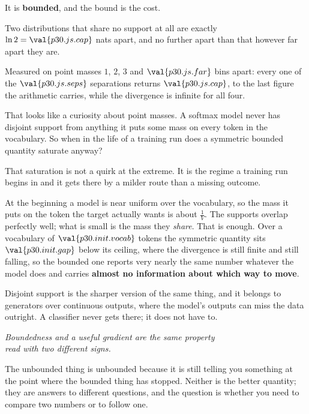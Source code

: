 \begin{fr}
\begin{ansblock}
It is \textbf{bounded}, and the bound is the cost.

Two distributions that share no support at all are exactly $\ln 2 =
\val{p30.js.cap}$ nats apart, and no further apart than that however far
apart they are.
\end{ansblock}

Measured on point masses $1$, $2$, $3$ and $\val{p30.js.far}$ bins apart:
every one of the $\val{p30.js.seps}$ separations returns
$\val{p30.js.cap}$, to the last figure the arithmetic carries, while the
divergence is infinite for all four.

That looks like a curiosity about point masses. A softmax model never has
disjoint support from anything \dash{} it puts some mass on every token in
the vocabulary. So when in the life of a training run does a symmetric
bounded quantity saturate anyway?
\dotline
\nextframe
\end{fr}

\begin{fr}

That saturation is not a quirk at the extreme. It is the regime a training
run begins in \dash{} and it gets there by a milder route than a missing
outcome.

At the beginning a model is near uniform over the vocabulary, so the mass it
puts on the token the target actually wants is about $\frac{1}{V}$. The
supports overlap perfectly well; what is small is the mass they \emph{share}.
That is enough. Over a vocabulary of $\val{p30.init.vocab}$ tokens the
symmetric quantity sits $\val{p30.init.gap}$ below its ceiling, where the
divergence is still finite and still falling, so the bounded one reports very
nearly the same number whatever the model does and carries \textbf{almost no
information about which way to move}.

Disjoint support is the sharper version of the same thing, and it belongs to
generators over continuous outputs, where the model's outputs can miss the
data outright. A classifier never gets there; it does not have to.

\begin{center}
\emph{Boundedness and a useful gradient are the same property\\
read with two different signs.}
\end{center}

The unbounded thing is unbounded because it is still telling you something at
the point where the bounded thing has stopped. Neither is the better
quantity; they are answers to different questions, and the question is
whether you need to compare two numbers or to follow one.
\end{fr}

